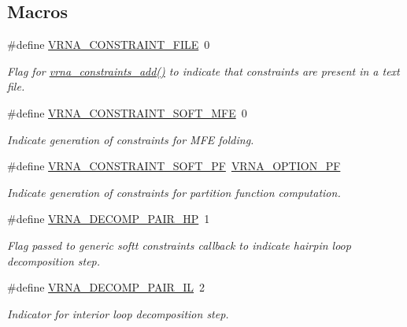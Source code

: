\subsection*{Macros}
\begin{DoxyCompactItemize}
\item 
\#define \hyperlink{group__constraints_ga62e0ed0c33002c09423de4e646f85a2b}{V\+R\+N\+A\+\_\+\+C\+O\+N\+S\+T\+R\+A\+I\+N\+T\+\_\+\+F\+I\+LE}~0
\begin{DoxyCompactList}\small\item\em Flag for \hyperlink{group__constraints_ga35a401f680969a556858a8dd5f1d07cc}{vrna\+\_\+constraints\+\_\+add()} to indicate that constraints are present in a text file. \end{DoxyCompactList}\item 
\#define \hyperlink{group__constraints_ga62aa195893d02d1a79ca94952748df36}{V\+R\+N\+A\+\_\+\+C\+O\+N\+S\+T\+R\+A\+I\+N\+T\+\_\+\+S\+O\+F\+T\+\_\+\+M\+FE}~0
\begin{DoxyCompactList}\small\item\em Indicate generation of constraints for M\+FE folding. \end{DoxyCompactList}\item 
\#define \hyperlink{group__constraints_ga03fb5000c19b9a2082bf4ea30a543045}{V\+R\+N\+A\+\_\+\+C\+O\+N\+S\+T\+R\+A\+I\+N\+T\+\_\+\+S\+O\+F\+T\+\_\+\+PF}~\hyperlink{group__fold__compound_gabfbadcddda3e74ce7f49035ef8f058f7}{V\+R\+N\+A\+\_\+\+O\+P\+T\+I\+O\+N\+\_\+\+PF}
\begin{DoxyCompactList}\small\item\em Indicate generation of constraints for partition function computation. \end{DoxyCompactList}\item 
\#define \hyperlink{group__constraints_ga8bd41ebc8039378d242e4e8c273716a5}{V\+R\+N\+A\+\_\+\+D\+E\+C\+O\+M\+P\+\_\+\+P\+A\+I\+R\+\_\+\+HP}~1
\begin{DoxyCompactList}\small\item\em Flag passed to generic softt constraints callback to indicate hairpin loop decomposition step. \end{DoxyCompactList}\item 
\#define \hyperlink{group__constraints_gaeab04f34d7730cff2d651d782f95d857}{V\+R\+N\+A\+\_\+\+D\+E\+C\+O\+M\+P\+\_\+\+P\+A\+I\+R\+\_\+\+IL}~2
\begin{DoxyCompactList}\small\item\em Indicator for interior loop decomposition step. \end{DoxyCompactList}\item 

\end{DoxyCompactItemize}
